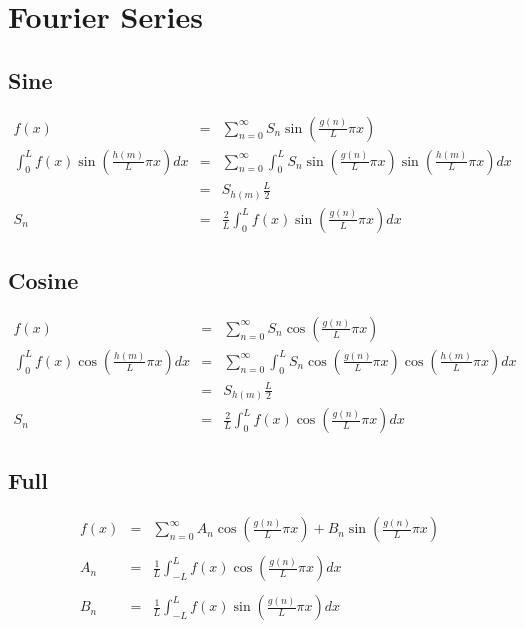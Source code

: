 \documentclass[12pt]{article}
\begin{document}
\parindent=0pt

\section{Fourier Series}
\subsection{Sine}
	\begin{eqnarray*}
	 	f(x) &=& \displaystyle\sum\limits_{n = 0}^{\infty} S_n \sin\left(\frac{g(n)}{L}\pi x \right) \\
	 	\displaystyle \int_{0}^{L} f(x)\sin\left(\frac{h(m)}{L}\pi x\right) dx &=& \sum\limits_{n = 0}^{\infty} \int_{0}^{L} S_n \sin\left(\frac{g(n)}{L}\pi x \right) \sin\left(\frac{h(m)}{L}\pi x\right) dx \\
		&=& S_{h(m)} \frac{L}{2} \\
		S_n &=&  \displaystyle \frac{2}{L} \int_{0}^{L} f(x)\sin\left(\frac{g(n)}{L}\pi x\right) dx
	\end{eqnarray*}
\subsection{Cosine}
	\begin{eqnarray*}
		f(x) &=& \displaystyle\sum\limits_{n = 0}^{\infty} S_n \cos\left(\frac{g(n)}{L}\pi x \right) \\
	 	\displaystyle \int_{0}^{L} f(x)\cos\left(\frac{h(m)}{L}\pi x\right) dx &=& \sum\limits_{n = 0}^{\infty} \int_{0}^{L} S_n \cos\left(\frac{g(n)}{L}\pi x \right) \cos\left(\frac{h(m)}{L}\pi x\right) dx \\
		&=& S_{h(m)} \frac{L}{2} \\
		S_n &=&  \displaystyle \frac{2}{L} \int_{0}^{L} f(x)\cos\left(\frac{g(n)}{L}\pi x\right) dx
	\end{eqnarray*}
\subsection{Full}
	\begin{eqnarray*}
		f(x) &=& \displaystyle\sum\limits_{n = 0}^{\infty} A_n \cos\left(\frac{g(n)}{L}\pi x \right) + B_n \sin \left( \frac{g(n)}{L} \pi x \right) \\ \\
		A_n &=&  \displaystyle \frac{1}{L} \int_{-L}^{L} f(x)\cos\left(\frac{g(n)}{L}\pi x\right) dx \\ \\
		B_n &=&  \displaystyle \frac{1}{L} \int_{-L}^{L} f(x)\sin\left(\frac{g(n)}{L}\pi x\right) dx \\ \\ \\ \\
	\end{eqnarray*}
\end{document}
